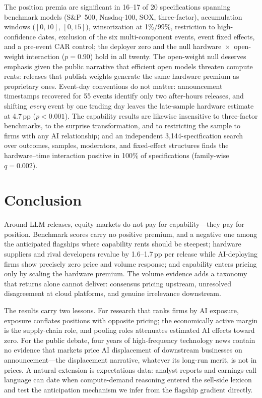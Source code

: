 \documentclass[review,12pt,authoryear]{elsarticle}
\newcommand{\pp}{\,pp}
\begin{document}
The position premia are significant in 16--17 of 20 specifications spanning
benchmark models (S\&P~500, Nasdaq-100, SOX, three-factor), accumulation
windows ($[0,10]$, $[0,15]$), winsorization at 1\%/99\%, restriction to
high-confidence dates, exclusion of the six multi-component events, event
fixed effects, and a pre-event CAR control; the deployer zero and the null
hardware~$\times$~open-weight interaction ($p=0.90$) hold in all twenty. The
open-weight null deserves emphasis given the public narrative that efficient
open models threaten compute rents: releases that publish weights generate
the same hardware premium as proprietary ones. Event-day conventions do not
matter: announcement timestamps recovered for 55 events identify only two
after-hours releases, and shifting \emph{every} event by one trading day
leaves the late-sample hardware estimate at 4.7\pp{} ($p<0.001$). The
capability results are likewise insensitive to three-factor benchmarks, to
the surprise transformation, and to restricting the sample to firms with any
AI relationship; and an independent 3,144-specification search over
outcomes, samples, moderators, and fixed-effect structures finds the
hardware--time interaction positive in 100\% of specifications (family-wise
$q=0.002$).

\section{Conclusion}\label{sec:conclusion}

Around LLM releases, equity markets do not pay for capability---they pay for
position. Benchmark scores carry no positive premium, and a negative one
among the anticipated flagships where capability rents should be steepest;
hardware suppliers and rival developers revalue by 1.6--1.7\pp{} per release
while AI-deploying firms show precisely zero price and volume response; and
capability enters pricing only by scaling the hardware premium. The volume
evidence adds a taxonomy that returns alone cannot deliver: consensus
pricing upstream, unresolved disagreement at cloud platforms, and genuine
irrelevance downstream.

The results carry two lessons. For research that ranks firms by AI exposure,
exposure conflates positions with opposite pricing; the economically active
margin is the supply-chain role, and pooling roles attenuates estimated AI
effects toward zero. For the public debate, four years of high-frequency
technology news contain no evidence that markets price AI displacement of
downstream businesses on announcement---the displacement narrative, whatever
its long-run merit, is not in prices. A natural extension is expectations
data: analyst reports and earnings-call language can date when
compute-demand reasoning entered the sell-side lexicon and test the
anticipation mechanism we infer from the flagship gradient directly.
\end{document}
